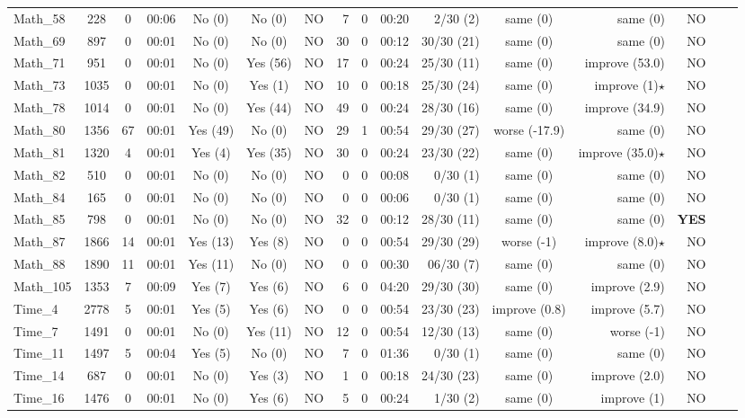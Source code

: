 \begin{table*}[htbp]
\begin{tabular}{lcccccrrrrrcrrrr}
Math\_58 & 228 & 0 & 00:06 & No (0) & No (0) & NO & 7 & 0 & 00:20 & 2/30 (2) & same (0) & same (0) & NO\\
Math\_69 & 897 & 0 & 00:01 & No (0) & No (0) & NO & 30 & 0 & 00:12 & 30/30 (21) & same (0) & same (0) & NO\\
Math\_71 & 951 & 0 & 00:01 & No (0) & Yes (56) & NO & 17 & 0 & 00:24 & 25/30 (11) & same (0) & improve (53.0) & NO\\
Math\_73 & 1035 & 0 & 00:01 & No (0) & Yes (1) & NO & 10 & 0 & 00:18 & 25/30 (24) & same (0) & improve (1)$\star$ & NO\\
Math\_78 & 1014 & 0 & 00:01 & No (0) & Yes (44) & NO & 49 & 0 & 00:24 & 28/30 (16) & same (0) & improve (34.9) & NO\\
Math\_80 & 1356 & 67 & 00:01 & Yes (49) & No (0) & NO & 29 & 1 & 00:54 & 29/30 (27) & worse (-17.9) & same (0) & NO\\
Math\_81 & 1320 & 4 & 00:01 & Yes (4) & Yes (35) & NO & 30 & 0 & 00:24 & 23/30 (22) & same (0) & improve (35.0)$\star$ & NO\\
Math\_82 & 510 & 0 & 00:01 & No (0) & No (0) & NO & 0 & 0 & 00:08 & 0/30 (1) & same (0) & same (0) & NO\\
Math\_84 & 165 & 0 & 00:01 & No (0) & No (0) & NO & 0 & 0 & 00:06 & 0/30 (1) & same (0) & same (0) & NO\\
Math\_85 & 798 & 0 & 00:01 & No (0) & No (0) & NO & 32 & 0 & 00:12 & 28/30 (11) & same (0) & same (0) & \bf{YES}\\
Math\_87 & 1866 & 14 & 00:01 & Yes (13) & Yes (8) & NO & 0 & 0 & 00:54 & 29/30 (29) & worse (-1) & improve (8.0)$\star$ & NO\\
Math\_88 & 1890 & 11 & 00:01 & Yes (11) & No (0) & NO & 0 & 0 & 00:30 & 06/30 (7) & same (0) & same (0) & NO\\
Math\_105 & 1353 & 7 & 00:09 & Yes (7) & Yes (6) & NO & 6 & 0 & 04:20 & 29/30 (30) & same (0) & improve (2.9) & NO\\
Time\_4 & 2778 & 5 & 00:01 & Yes (5) & Yes (6) & NO & 0 & 0 & 00:54 & 23/30 (23) & improve (0.8) & improve (5.7) & NO\\
Time\_7 & 1491 & 0 & 00:01 & No (0) & Yes (11) & NO & 12 & 0 & 00:54 & 12/30 (13) & same (0) & worse (-1) & NO\\
Time\_11 & 1497 & 5 & 00:04 & Yes (5) & No (0) & NO & 7 & 0 & 01:36 & 0/30 (1) & same (0) & same (0) & NO\\
Time\_14 & 687 & 0 & 00:01 & No (0) & Yes (3) & NO & 1 & 0 & 00:18 & 24/30 (23) & same (0) & improve (2.0) & NO\\
Time\_16 & 1476 & 0 & 00:01 & No (0) & Yes (6) & NO & 5 & 0 & 00:24 & 1/30 (2) & same (0) & improve (1) & NO\\
	\bottomrule
  \end{tabular}
\end{table*}